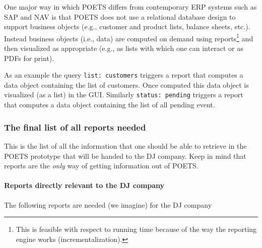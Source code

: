 \documentclass[envcountsame]{llncs}
\begin{document}
One major way in which POETS differs from contemporary ERP systems
such as SAP and NAV is that POETS does not use a relational database
design to support business objects (e.g., customer and product lists,
balance sheets, etc.). Instead business objects (i.e., data) are
computed on demand using reports\footnote{This is feasible with
  respect to running time because of the way the reporting engine
  works (incrementalization).} and then visualized as appropriate
(e.g., as lists with which one can interact or as PDFs for print).

As an example the query \texttt{list: customers} triggers a report
that computes a data object containing the list of customers. Once
computed this data object is visualized (as a list) in the
GUI. Similarly \texttt{status: pending} triggers a report that
computes a data object containing the list of all pending event.


\subsubsection{The final list of all reports needed}

This is the list of all the information that one should be able to
retrieve in the POETS prototype that will be handed to the DJ
company. Keep in mind that reports are the \emph{only} way of getting
information out of POETS.

\paragraph{Reports directly relevant to the DJ company}

The following reports are needed (we imagine) for the DJ company








\end{document}
